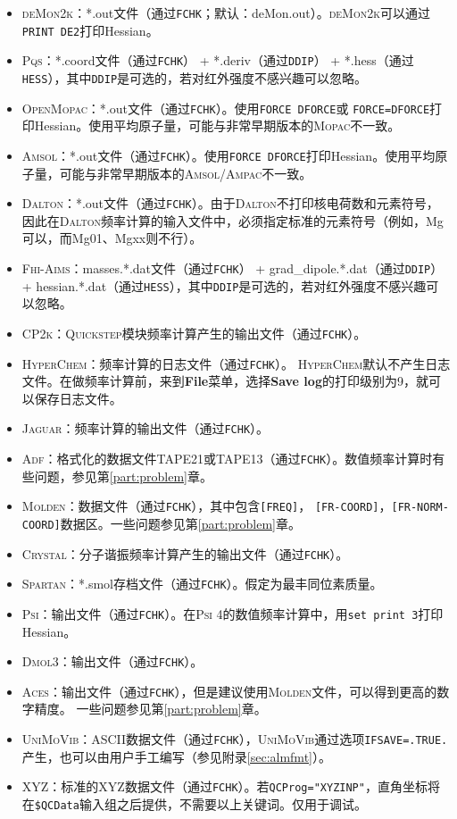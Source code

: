 \documentclass[12pt,a4paper,openany,twoside,cap,UTF8]{ctexbook}
\begin{document}
\begin{itemize}
\item \textsc{deMon2k}：*.out文件（通过\verb|FCHK|；默认：deMon.out）。\textsc{deMon2k}可以通过\texttt{PRINT DE2}打印Hessian。
\item \textsc{Pqs}：*.coord文件（通过\verb|FCHK|） + *.deriv（通过\verb|DDIP|） + *.hess（通过\verb|HESS|），其中\verb|DDIP|是可选的，若对红外强度不感兴趣可以忽略。
\item \textsc{OpenMopac}：*.out文件（通过\verb|FCHK|）。使用\texttt{FORCE DFORCE}或
\texttt{FORCE=DFORCE}打印Hessian。使用平均原子量，可能与非常早期版本的\textsc{Mopac}不一致。
\item \textsc{Amsol}：*.out文件（通过\verb|FCHK|）。使用\texttt{FORCE DFORCE}打印Hessian。使用平均原子量，可能与非常早期版本的\textsc{Amsol/Ampac}不一致。
\item \textsc{Dalton}：*.out文件（通过\verb|FCHK|）。由于\textsc{Dalton}不打印核电荷数和元素符号，因此在\textsc{Dalton}频率计算的输入文件中，必须指定标准的元素符号（例如，Mg可以，而Mg01、Mgxx则不行）。
\item \textsc{Fhi-Aims}：masses.*.dat文件（通过\verb|FCHK|） + grad{\_}dipole.*.dat（通过\verb|DDIP|） + hessian.*.dat（通过\verb|HESS|），其中\verb|DDIP|是可选的，若对红外强度不感兴趣可以忽略。
\item \textsc{CP2k}：\textsc{Quickstep}模块频率计算产生的输出文件（通过\verb|FCHK|）。
\item \textsc{HyperChem}：频率计算的日志文件（通过\verb|FCHK|）。
\textsc{HyperChem}默认不产生日志文件。在做频率计算前，来到\textbf{File}菜单，选择\textbf{Save log}的打印级别为9，就可以保存日志文件。
\item \textsc{Jaguar}：频率计算的输出文件（通过\verb|FCHK|）。
\item \textsc{Adf}：格式化的数据文件TAPE21或TAPE13（通过\verb|FCHK|）。数值频率计算时有些问题，参见第\ref{part:problem}章。
\item \textsc{Molden}：数据文件（通过\verb|FCHK|），其中包含\verb|[FREQ]|，
\verb|[FR-COORD]|，\verb|[FR-NORM-COORD]|数据区。一些问题参见第\ref{part:problem}章。
\item \textsc{Crystal}：分子谐振频率计算产生的输出文件（通过\verb|FCHK|）。
\item \textsc{Spartan}：*.smol存档文件（通过\verb|FCHK|）。假定为最丰同位素质量。
\item \textsc{Psi}：输出文件（通过\verb|FCHK|）。在\textsc{Psi} 4的数值频率计算中，用\texttt{set print 3}打印Hessian。
\item \textsc{Dmol3}：输出文件（通过\verb|FCHK|）。
\item \textsc{Aces}：输出文件（通过\verb|FCHK|），但是建议使用\textsc{Molden}文件，可以得到更高的数字精度。 一些问题参见第\ref{part:problem}章。
\item \textsc{UniMoVib}：ASCII数据文件（通过\verb|FCHK|），\textsc{UniMoVib}通过选项\verb|IFSAVE=.TRUE.|产生，也可以由用户手工编写（参见附录\ref{sec:almfmt}）。
\item XYZ：标准的XYZ数据文件（通过\verb|FCHK|）。若\verb|QCProg="XYZINP"|，直角坐标将在\texttt{\$QCData}输入组之后提供，不需要以上关键词。仅用于调试。
\end{itemize}
\end{document}
